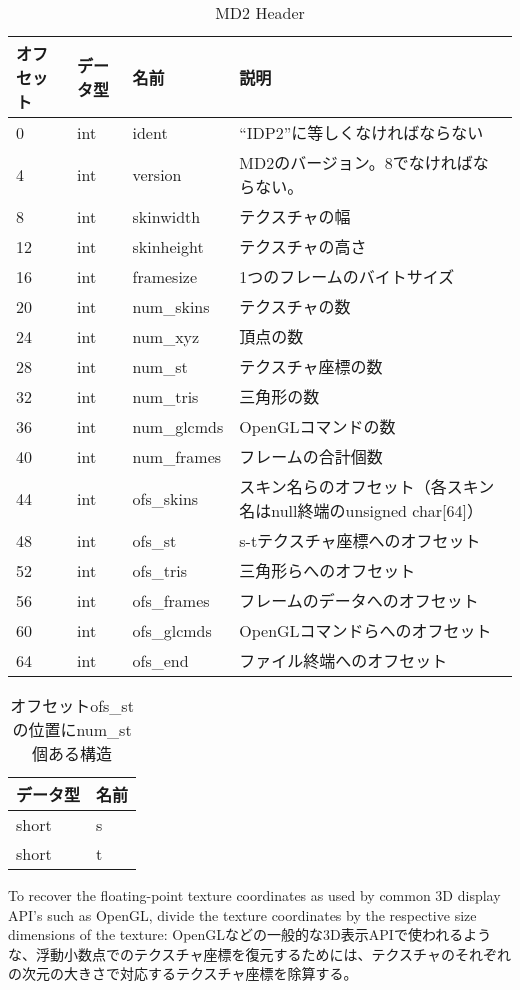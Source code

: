 \documentclass[uplatex,dvipdfmx]{jsarticle} \usepackage{amsmath,amssymb,bm}
\begin{document}
\begin{table}
	\begin{tabular}{llll}
オフセット&データ型&名前&説明\\\hline
0&int&ident& ``IDP2''に等しくなければならない\\
4&int&version&MD2のバージョン。8でなければならない。\\
8&int&skinwidth&テクスチャの幅\\
12&int&skinheight&テクスチャの高さ\\
16&int&framesize&1つのフレームのバイトサイズ\\
20&int&num\_skins&テクスチャの数\\
24&int&num\_xyz&頂点の数\\
28&int&num\_st&テクスチャ座標の数\\
32&int&num\_tris&三角形の数\\
36&int&num\_glcmds&OpenGLコマンドの数\\
40&int&num\_frames&フレームの合計個数\\
44&int&ofs\_skins&スキン名らのオフセット（各スキン名はnull終端のunsigned char[64]）\\
48&int&ofs\_st&s-tテクスチャ座標へのオフセット\\
52&int&ofs\_tris&三角形らへのオフセット\\
56&int&ofs\_frames&フレームのデータへのオフセット\\
60&int&ofs\_glcmds&OpenGLコマンドらへのオフセット\\
64&int&ofs\_end&ファイル終端へのオフセット\\\hline
	\end{tabular}
	\caption{MD2 Header}
\end{table}

\begin{table}
	\begin{tabular}{ll}
データ型&名前\\\hline
short&s\\
short&t\\\hline
	\end{tabular}
	\caption{オフセットofs\_stの位置にnum\_st個ある構造}
\end{table}

\vspace{\baselineskip}
\begin{paracol}{2}
To recover the floating-point texture coordinates as used by common 3D display API's such as OpenGL, divide the texture coordinates by the respective size dimensions of the texture:
\switchcolumn
OpenGLなどの一般的な3D表示APIで使われるような、浮動小数点でのテクスチャ座標を復元するためには、テクスチャのそれぞれの次元の大きさで対応するテクスチャ座標を除算する。
\end{paracol}
\end{document}
